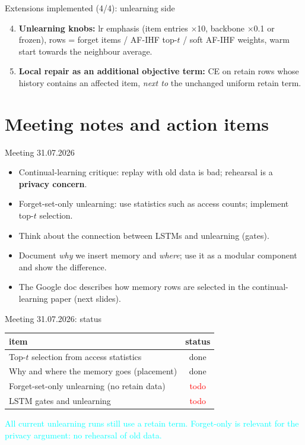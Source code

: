 \documentclass{beamer}
\newcommand{\pierre}[1]{\textcolor{cyan}{#1}}
\newcommand{\stdone}{\textcolor{green!50!black}{done}}
\newcommand{\sttodo}{\textcolor{red}{todo}}
\begin{document}
\begin{frame}{Extensions implemented (4/4): unlearning side}
\begin{enumerate}
  \setcounter{enumi}{3}
  \item \textbf{Unlearning knobs:} lr emphasis (item entries $\times$10,
        backbone $\times$0.1 or frozen), rows = forget items / AF-IHF top-$t$ /
        soft AF-IHF weights, warm start towards the neighbour average.
  \item \textbf{Local repair as an additional objective term:} CE on retain rows
        whose history contains an affected item, \emph{next to} the unchanged
        uniform retain term.
\end{enumerate}
\end{frame}

\section{Meeting notes and action items}

\begin{frame}{Meeting 31.07.2026}
\begin{itemize}
  \item Continual-learning critique: replay with old data is bad; rehearsal is
        a \textbf{privacy concern}.
  \item Forget-set-only unlearning: use statistics such as access counts;
        implement top-$t$ selection.
  \item Think about the connection between LSTMs and unlearning (gates).
  \item Document \emph{why} we insert memory and \emph{where}; use it as a
        modular component and show the difference.
  \item The Google doc describes how memory rows are selected in the
        continual-learning paper (next slides).
\end{itemize}
\end{frame}

\begin{frame}{Meeting 31.07.2026: status}
\begin{center}
\small
\begin{tabular}{|l|c|}
\hline
item & status \\
\hline
Top-$t$ selection from access statistics & \stdone \\
Why and where the memory goes (placement) & \stdone \\
Forget-set-only unlearning (no retain data)                          & \sttodo \\
LSTM gates and unlearning                                            & \sttodo \\
\hline
\end{tabular}
\end{center}

\medskip
\pierre{All current unlearning runs still use a retain term. Forget-only is
relevant for the privacy argument: no rehearsal of old data.}
\end{frame}
\end{document}
